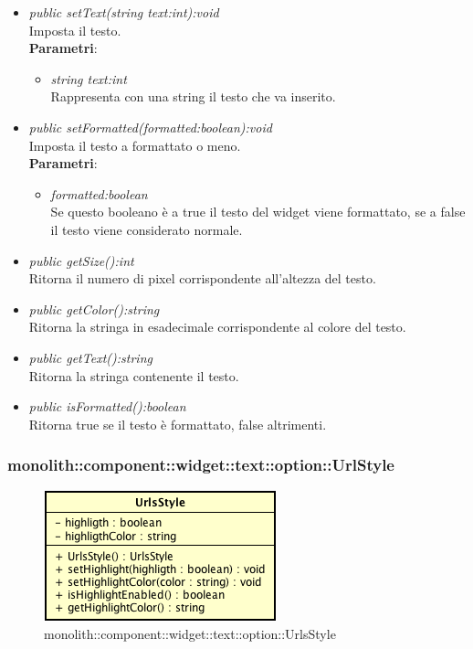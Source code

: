 \begin{itemize}
\begin{itemize}
\begin{itemize}
		\end{itemize} 
	\item \textit{public setText(string text:int):void}\\
	Imposta il testo.
		\\ \textbf{Parametri}: \begin{itemize}
		\item \textit{string text:int}\\
		Rappresenta con una string il testo che va inserito.
		\end{itemize} 
	\item \textit{public setFormatted(formatted:boolean):void}\\
	Imposta il testo a formattato o meno.
		\\ \textbf{Parametri}: \begin{itemize}
		\item \textit{formatted:boolean}\\
		Se questo booleano è a true il testo del widget viene formattato, se a false il testo viene considerato normale.
		\end{itemize} 
	\item \textit{public getSize():int}\\
	Ritorna il numero di pixel corrispondente all'altezza del testo.
	\item \textit{public getColor():string}\\
	Ritorna  la stringa in esadecimale corrispondente al colore del testo.
	\item \textit{public getText():string}\\
	Ritorna la stringa contenente il testo.
	\item \textit{public isFormatted():boolean}\\
	Ritorna true se il testo è formattato, false altrimenti.
	\end{itemize}
\end{itemize}

\subsubsection{monolith::component::widget::text::option::UrlStyle}

\label{monolith::component::widget::text::option::UrlsStyle}
\begin{figure}[H]
	\centering
	\includegraphics[scale=0.5]{Sezioni/SottosezioniST/img/UrlsStyle.png}
	\caption{monolith::component::widget::text::option::UrlsStyle}
\end{figure}

